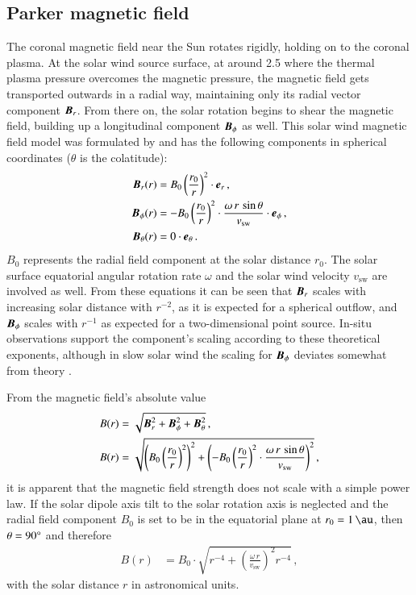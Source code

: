 \subsection{Parker magnetic field}
The coronal magnetic field near the Sun rotates rigidly, holding on to the coronal plasma. At the solar wind source surface, at around \SI{2.5}{\Rs} where the thermal plasma pressure overcomes the magnetic pressure, the magnetic field gets transported outwards in a radial way, maintaining only its radial vector component $\boldsymbol{B}_r$. From there on, the solar rotation begins to shear the magnetic field, building up a longitudinal component $\boldsymbol{B}_\phi$ as well. This solar wind magnetic field model was formulated by \citet{Parker1958} and has the following components in spherical coordinates ($\theta$ is the colatitude):
\begin{align}
	\boldsymbol{B}_r(r) &= B_0 \left(\frac{r_0}{r}\right)^2 \cdot \boldsymbol{e}_r\,,\\
	\boldsymbol{B}_\phi(r) &= -B_0 \left(\frac{r_0}{r}\right)^2 \cdot \frac{\omega\,r\,\sin\theta}{v_\text{sw}} \cdot \boldsymbol{e}_\phi	\,,	\label{eq:b_phi_vector}\\
	\boldsymbol{B}_\theta(r) &= 0 \cdot \boldsymbol{e}_\theta\,.
\end{align}
$B_0$ represents the radial field component at the solar distance $r_0$. The solar surface equatorial angular rotation rate $\omega$ and the solar wind velocity $v_\text{sw}$ are involved as well. From these equations it can be seen that $\boldsymbol{B}_r$ scales with increasing solar distance with $r^{-2}$, as it is expected for a spherical outflow, and $\boldsymbol{B}_\phi$ scales with $r^{-1}$ as expected for a two-dimensional point source. In-situ observations support the component's scaling according to these theoretical exponents, although in slow solar wind the scaling for $\boldsymbol{B}_\phi$ deviates somewhat from theory \citep{Mariani1978}.

From the magnetic field's absolute value
\begin{align}
	B(r) &= \sqrt{\boldsymbol{B}_r^2 + \boldsymbol{B}_\phi^2 + \boldsymbol{B}_\theta^2}\,,	\label{eq:B_absolute}\\
	B(r) &= \sqrt{\left(B_0 \left(\frac{r_0}{r}\right)^2\right)^2 + \left(-B_0 \left(\frac{r_0}{r}\right)^2 \cdot \frac{\omega\,r\,\sin\theta}{v_\text{sw}}\right)^2}\,,
\end{align}
it is apparent that the magnetic field strength does not scale with a simple power law. If the solar dipole axis tilt to the solar rotation axis is neglected and the radial field component $B_0$ is set to be in the equatorial plane at $r_0 = \SI{1}{\au}$, then $\theta = 90\degree$ and therefore
\begin{align}
	B(r) &= B_0 \cdot \sqrt{r^{-4} + \left(\frac{\omega\,r}{v_\text{sw}}\right)^2 r^{-4}}\,,	\label{eq:B_1au}
\end{align}
with the solar distance $r$ in astronomical units.

